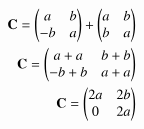 \begin{align}
 \vec{C}=\myvec{a &b\\-b &a}+\myvec{a &b\\b&a}
 \\
 \vec{C}= \myvec{
 a+a & b+b\\
 -b+b & a+a}
 \\
 \vec{C}=\myvec{
 2a & 2b\\
 0 & 2a}
 \end{align}
 

